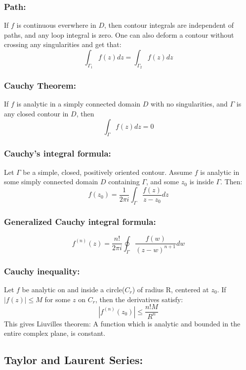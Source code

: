 \documentclass[a4paper,norsk, 10pt]{article}
\begin{document}
\subsubsection{Path:}
If $f$ is continuous everwhere in $D$, then contour integrals are independent of paths, and any loop integral is zero. One can also deform a contour without crossing any singularities and get that:
\begin{equation}
\int_{\Gamma_1}f(z) dz = \int_{\Gamma_2}f(z) dz
\end{equation}

\subsubsection{Cauchy Theorem:}
If $f$ is analytic in a simply connected domain $D$ with no singularities, and $\Gamma$ is any closed contour in $D$, then
\begin{equation}
\int_{\Gamma}f(z) dz = 0
\end{equation}
\subsubsection{Cauchy's integral formula:}
Let $\Gamma$ be a simple, closed, positively oriented contour. Assume $f$ is analytic in some simply connected domain $D$ containing $\Gamma$, and some $z_0$ is inside $\Gamma$. Then:
\begin{equation}
f(z_0) = \frac{1}{2\pi i}\int_{\Gamma}\frac{f(z)}{z-z_0}dz
\end{equation}
\subsubsection{Generalized Cauchy integral formula:}
\begin{equation}
f^{(n)}(z) = \frac{n!}{2\pi i}\oint_{\Gamma}\frac{f(w)}{(z-w)^{n+1}}dw
\end{equation}
\subsubsection{Cauchy inequality:}
Let $f$ be analytic on and inside a circle($C_r$) of radius R, centered at $z_0$. If $|f(z)|\leq M$ for some $z$ on $C_r$, then the derivatives satisfy:
\begin{equation}
|f^{(n)}(z_0)| \leq \frac{n!M}{R^n}
\end{equation}
This gives Liuvilles theorem: A function which is analytic and bounded in the entire complex plane, is constant.
\subsection{Taylor and Laurent Series:}
\end{document}
